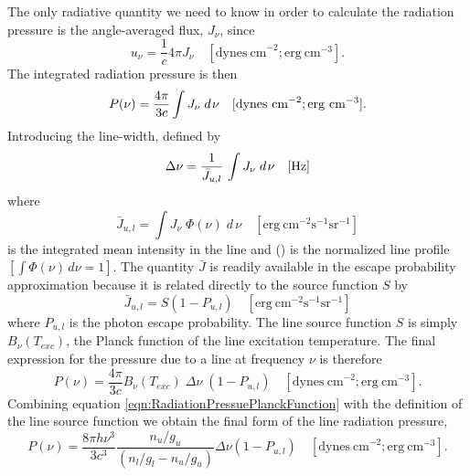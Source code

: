 The only radiative quantity we need to know in order to calculate the
radiation pressure is the angle-averaged flux, $J_\nu$, since
\begin{equation}
{u_\nu } = \frac{1}{c}4\pi {J_\nu }
\quad [\mathrm{dynes~ cm}^{-2}; \mathrm{erg~ cm}^{-3}].
\end{equation}
The integrated radiation pressure is then
\begin{equation}
P(\nu ) = \frac{{4\pi }}{{3c}}\int {{J_\nu }\;d{\kern 1pt} \nu }
\quad [\mathrm{dynes~ cm}^{-2}; \mathrm{erg~ cm}^{-3}] .
\end{equation}
Introducing the line-width, defined by
\begin{equation}
\Delta \nu  = \frac{1}{{{{\bar J}_{u,l}}}}\,\int {{J_\nu }\;d{\kern 1pt}
\nu }
\quad [\mathrm{Hz}]
\end{equation}
where
\begin{equation}
{\bar J_{u,l}} = \int {{J_\nu }\;\Phi \left( \nu  \right)\;d\,\nu }
\quad [\mathrm{erg~ cm}^{-2} \mathrm{s}^{-1} \mathrm{sr}^{-1}]
\end{equation}
is the integrated mean intensity in the line and () is the normalized line
profile $\left[ {\int {\Phi (\nu )\,d\nu  = 1} } \right]$.  The quantity
$\bar J$
 is readily available in the escape probability approximation because it
is related directly to the source function $S$ by
\begin{equation}
{\bar J_{u,l}} = S\left( {1 - {P_{u,l}}} \right)
\quad [\mathrm{erg~ cm}^{-2} \mathrm{s}^{-1} \mathrm{sr}^{-1}]
\end{equation}
where $P_{u,l}$ is the photon escape probability.  The line source function
$S$
is simply ${B_\nu }\left( {{T_{exc}}} \right)$, the Planck function of the line excitation temperature.  The final
expression for the pressure due to a line at frequency $\nu$ is therefore
\begin{equation}
\label{eqn:RadiationPressuePlanckFunction}
P\left( \nu  \right) = \frac{{4\pi }}{{3c}}{B_\nu }\left( {{T_{exc}}}
\right)\;\Delta \nu \;\left( {1 - {P_{u,l}}} \right)
\quad [\mathrm{dynes~ cm}^{-2}; \mathrm{erg~ cm}^{-3}].
\end{equation}
Combining equation \ref{eqn:RadiationPressuePlanckFunction} with the definition of the line source function we
obtain the final form of the line radiation pressure,
\begin{equation}
P(\nu)=\frac{8\pi h\nu^3}{3c^3} \frac{n_u/g_u}{(n_l/g_l-n_u/g_u)} \Delta \nu
(1-P_{u,l})
\quad [\mathrm{dynes~ cm}^{-2}; \mathrm{erg~ cm}^{-3}].
\end{equation}
